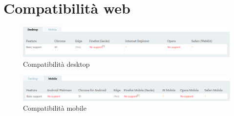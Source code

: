 \documentclass[11pt ,a4paper , twoside , openright ]{article}
\begin{document}
	\section{Compatibilità web}
	\begin{figure}[h]
		\centering
		\includegraphics[width=1\linewidth]{Compatibilita1}
		\caption{Compatibilità desktop}
		\label{fig: Compatibilità desktop}
	\end{figure}
	\begin{figure}[h]
		\centering
		\includegraphics[width=1\linewidth]{Compatibilita2}
		\caption{Compatibilità mobile}
		\label{fig: Compatibilità mobile}
	\end{figure}
	\newpage
\end{document}
